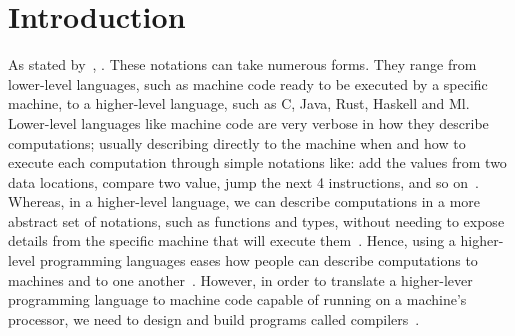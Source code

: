 \documentclass[
    oneside,
    english,
    coorientadorbanca,
    embeddedlogo,
    noabntexcite
]{ufsc-thesis-rn46-2019}
\begin{document}

\tableofcontents*

\textual{}

\chapter{Introduction}\label{chapter:introduction}

As stated by~\textcite{Aho:2006:CPT:1177220}, .
These notations can take numerous forms.
They range from lower-level languages, such as machine code ready to be executed by a specific machine, to a higher-level language, such as C, Java, Rust, Haskell and Ml.
Lower-level languages like machine code are very verbose in how they describe computations; usually describing directly to the machine when and how to execute each computation through simple notations like: add the values from two data locations, compare two value, jump the next 4 instructions, and so on~\cite{Aho:2006:CPT:1177220}.
Whereas, in a higher-level language, we can describe computations in a more abstract set of notations, such as functions and types, without needing to expose details from the specific machine that will execute them~\cite{Aho:2006:CPT:1177220}.
Hence, using a higher-level programming languages eases how people can describe computations to machines and to one another~\cite{Aho:2006:CPT:1177220}.
However, in order to translate a higher-lever programming language to machine code capable of running on a machine's processor, we need to design and build programs called compilers~\cite{Aho:2006:CPT:1177220}.
\end{document}
